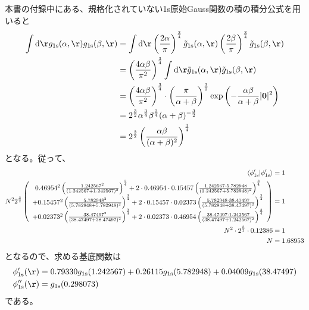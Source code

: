 本書の付録中にある、規格化されていない1s原始Gauss関数の積の積分公式を用いると
\begin{align}
	\int\d\r
		g_{\rm 1s}(\alpha,\r)
		g_{\rm 1s}(\beta,\r)
&=
	\int\d\r
		\left(
			\frac{2\alpha}{\pi}
		\right)^{\frac{3}{4}}
		\tilde{g}_{\rm 1s}(\alpha,\r)
		\left(
			\frac{2\beta}{\pi}
		\right)^{\frac{3}{4}}
		\tilde{g}_{\rm 1s}(\beta,\r) \\
%
%
&=
	\left(
		\frac{4\alpha\beta}{\pi^2}
	\right)^{\frac{3}{4}}
	\int\d\r
		\tilde{g}_{\rm 1s}(\alpha,\r)
		\tilde{g}_{\rm 1s}(\beta,\r) \\
%
%
&=
	\left(
		\frac{4\alpha\beta}{\pi^2}
	\right)^{\frac{3}{4}} \cdot
	\left(
		\frac{\pi}{\alpha+\beta}
	\right)^{\frac{3}{2}}
	\exp\left(
		-\frac{\alpha\beta}{\alpha+\beta}|\bm{0}|^2
	\right) \\
%
%
&=
	2^{\frac{3}{2}}
	\alpha^{\frac{3}{4}}
	\beta^{\frac{3}{4}}
	(\alpha+\beta)^{-\frac{3}{2}} \\
%
%
&=
	2^{\frac{3}{2}}
	\left(
		\frac{
			\alpha\beta
		}{
			(\alpha+\beta)^2
		}
	\right)^{\frac{3}{4}}
\end{align}
となる。従って、
\begin{align}
	\braket{\phi'_{\rm 1s}|\phi'_{\rm 1s}}
&=
	1 \\
%
%
	N^2
	2^{\frac{3}{2}}
	\left(
	\begin{array}{c}
		0.46954^2
		\left(
			\frac{
				1.242567^2
			}{
				(
					1.242567
					+
					1.242567
				)^2
			}
		\right)^{\frac{3}{4}}
		+
		2 \cdot 0.46954 \cdot 0.15457
		\left(
			\frac{
				1.242567 \cdot 5.782948
			}{
				(
					1.242567
					+
					5.782948
				)^2
			}
		\right)^{\frac{3}{4}} \\
		+
		0.15457^2
		\left(
			\frac{
				5.782948^2
			}{
				(
					5.782948
					+
					5.782948
				)^2
			}
		\right)^{\frac{3}{4}}
		+
		2 \cdot 0.15457 \cdot 0.02373
		\left(
			\frac{
				5.782948 \cdot 38.47497
			}{
				(
					5.782948
					+
					38.47497
				)^2
			}
		\right)^{\frac{3}{4}} \\
		+
		0.02373^2
		\left(
			\frac{
				38.47497^2
			}{
				(
					38.47497
					+
					38.47497
				)^2
			}
		\right)^{\frac{3}{4}}
		+
		2 \cdot 0.02373 \cdot 0.46954
		\left(
			\frac{
				38.47497 \cdot 1.242567
			}{
				(
					38.47497
					+
					1.242567
				)^2
			}
		\right)^{\frac{3}{4}}
	\end{array}
	\right)
&=
	1 \\
%
%
	N^2 \cdot
	2^{\frac{3}{2}} \cdot
	0.12386
&=
	1 \\
%
%
	N
&=
	1.68953
\end{align}
となるので、求める基底関数は
\begin{align}
	\phi'_{\rm 1s}(\r)
&=
	0.79330 g_{\rm 1s}(1.242567)
	+
	0.26115 g_{\rm 1s}(5.782948)
	+
	0.04009 g_{\rm 1s}(38.47497) \\
%
%
	\phi''_{\rm 1s}(\r)
&=
	g_{\rm 1s}(0.298073)
\end{align}
である。




